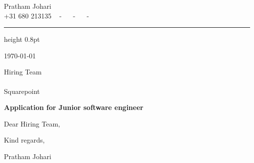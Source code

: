 \documentclass[letterpaper,11pt]{article}
\newcommand{\recipientName}{Hiring Team}                      %
\newcommand{\recipientTitle}{}                                     %
\newcommand{\companyName}{Squarepoint}                        %
\newcommand{\jobTitle}{Junior software engineer}
\newcommand{\letterDate}{\today}                       %
\newcommand{\salutation}{Dear \recipientName{},}          %
\newcommand{\closing}{Kind regards,}
\begin{document}
\begin{center}
  {\huge Pratham Johari} \\[12pt]
  {+31 680 213135} ~
  \small{-}~
  \href{https://github.com/pratham2442000}{\color{blue}{github.com/pratham2442000}} ~
  \small{-}~
  \href{mailto:pratham244200@gmail.com}{\color{blue}{pratham244200@gmail.com}} ~
  \small{-}~
  \href{https://www.linkedin.com/in/prathamjohari/}{\color{blue}{linkedin.com/in/prathamjohari/}}
\end{center}

\vspace{4pt}
{\color{airforceblue}\hrule height 0.8pt}
\vspace{16pt}

\letterDate

\vspace{12pt}

\recipientName \\
\if\relax\detokenize\expandafter{\recipientTitle}\relax\else\recipientTitle \\\fi
\companyName \\
\vspace{12pt}

\textbf{\color{airforceblue}Application for \jobTitle{}}

\vspace{8pt}

\salutation

\vspace{4pt}


\vspace{16pt}

\closing

\vspace{16pt}

Pratham Johari
\end{document}
